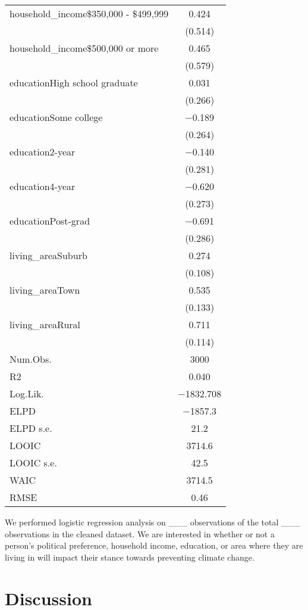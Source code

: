 \documentclass[
  letterpaper,
  DIV=11,
  numbers=noendperiod]{scrartcl}
\begin{document}
\begin{table}
\begin{tabular}[t]{lc}
household\_income\$350,000 - \$499,999 & \num{0.424}\\
 & (\num{0.514})\\
household\_income\$500,000 or more & \num{0.465}\\
 & (\num{0.579})\\
educationHigh school graduate & \num{0.031}\\
 & (\num{0.266})\\
educationSome college & \num{-0.189}\\
 & (\num{0.264})\\
education2-year & \num{-0.140}\\
 & (\num{0.281})\\
education4-year & \num{-0.620}\\
 & (\num{0.273})\\
educationPost-grad & \num{-0.691}\\
 & (\num{0.286})\\
living\_areaSuburb & \num{0.274}\\
 & (\num{0.108})\\
living\_areaTown & \num{0.535}\\
 & (\num{0.133})\\
living\_areaRural & \num{0.711}\\
 & (\num{0.114})\\
\midrule
Num.Obs. & \num{3000}\\
R2 & \num{0.040}\\
Log.Lik. & \num{-1832.708}\\
ELPD & \num{-1857.3}\\
ELPD s.e. & \num{21.2}\\
LOOIC & \num{3714.6}\\
LOOIC s.e. & \num{42.5}\\
WAIC & \num{3714.5}\\
RMSE & \num{0.46}\\
\bottomrule
\end{tabular}
\end{table}

We performed logistic regression analysis on \_\_\_ observations of the
total \_\_\_ observations in the cleaned dataset. We are interested in
whether or not a person's political preference, household income,
education, or area where they are living in will impact their stance
towards preventing climate change.

\hypertarget{discussion}{%
\section{Discussion}\label{discussion}}
\end{document}
